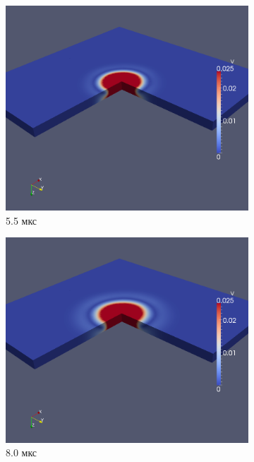 \begin{figure}[htp]
\begin{subfigure}[b]{0.5\textwidth}
\centering
\includegraphics[width=\textwidth]{png/pkm-experiment/wing-only/wave-3d/v-0009.png}
\caption{5.5 мкс}
\end{subfigure}
\begin{subfigure}[b]{0.5\textwidth}
\centering
\includegraphics[width=\textwidth]{png/pkm-experiment/wing-only/wave-3d/v-0013.png}
\caption{8.0 мкс}
\end{subfigure}
\begin{subfigure}[b]{0.5\textwidth}

\end{subfigure}
\end{figure}
